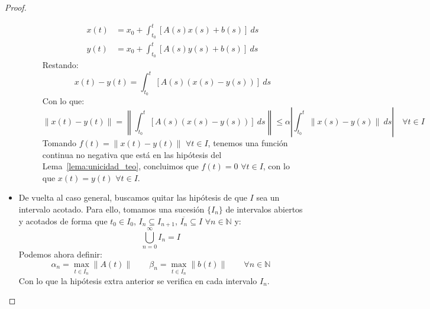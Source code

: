 \begin{teo}
\begin{proof}
\begin{itemize}
\begin{description}
\begin{align*}
                            x(t) &= x_0 + \int_{t_0}^{t} [A(s)x(s)+b(s)]~ds \\
                            y(t) &= x_0 + \int_{t_0}^{t} [A(s)y(s)+b(s)]~ds 
                        \end{align*}
                        Restando:
                        \begin{equation*}
                            x(t) - y(t) = \int_{t_0}^{t} [A(s)(x(s)-y(s))]~ds 
                        \end{equation*}
                        Con lo que:
                        \begin{equation*}
                            \|x(t) - y(t)\| = \left\|\int_{t_0}^{t} [A(s)(x(s)-y(s))]~ds \right\| \leq \alpha\left|\int_{t_0}^{t} \|x(s)-y(s)\|~ds \right| \quad \forall t\in I
                        \end{equation*}
                        Tomando $f(t) = \|x(t)-y(t)\|$ $\forall t\in I$, tenemos una función continua no negativa que está en las hipótesis del Lema~\ref{lema:unicidad_teo}, concluimos que $f(t) = 0$ $\forall t\in I$, con lo que $x(t) = y(t)$ $\forall t\in I$.
                \end{description}
            \item De vuelta al caso general, buscamos quitar las hipótesis de que $I$ sea un intervalo acotado. Para ello, tomamos una sucesión $\{I_n\}$ de intervalos abiertos y acotados de forma que $t_0\in I_0$, $I_n\subseteq I_{n+1}$, $\overline{I_n}\subseteq I$ $\forall n\in \mathbb{N}$ y:
                \begin{equation*}
                    \bigcup_{n=0}^\infty I_n = I
                \end{equation*}
                Podemos ahora definir: 
                \begin{equation*}
                    \alpha_n = \max_{t\in \overline{I_n}} \|A(t)\| \qquad \beta_n = \max_{t\in \overline{I_n}} \|b(t)\| \qquad \forall n\in \mathbb{N}
                \end{equation*}
                Con lo que la hipótesis extra anterior se verifica en cada intervalo $I_n$.


\end{itemize}
\end{proof}
\end{teo}
